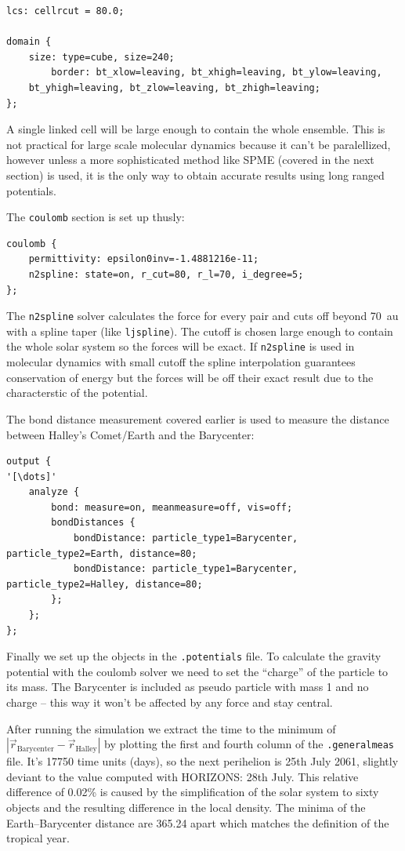 \begin{lstlisting}
lcs: cellrcut = 80.0;

domain {
    size: type=cube, size=240;
        border: bt_xlow=leaving, bt_xhigh=leaving, bt_ylow=leaving,
    bt_yhigh=leaving, bt_zlow=leaving, bt_zhigh=leaving;
};
\end{lstlisting}

A single linked cell will be large enough to contain the whole
ensemble. This is not practical for large scale molecular dynamics
because it can't be paralellized, however unless a more sophisticated
method like SPME (covered in the next section) is used, it is the only
way to obtain accurate results using long ranged potentials.

The \texttt{coulomb} section is set up thusly:

\begin{lstlisting}
coulomb {
    permittivity: epsilon0inv=-1.4881216e-11;
    n2spline: state=on, r_cut=80, r_l=70, i_degree=5;
};
\end{lstlisting}

The \texttt{n2spline} solver calculates the force for every pair and cuts
off beyond \SI{70}{\astronomicalunit} with a spline taper (like
\texttt{ljspline}). The cutoff is chosen large enough to contain the
whole solar system so the forces will be exact. If \texttt{n2spline} is
used in molecular dynamics with small cutoff the spline interpolation
guarantees conservation of energy but the forces will be off their exact
result due to the characterstic of the potential.

The bond distance measurement covered earlier is used to measure the
distance between Halley's Comet/Earth and the Barycenter:
\begin{lstlisting}[escapechar=']
output {
'[\dots]'
    analyze {
        bond: measure=on, meanmeasure=off, vis=off;
        bondDistances {
            bondDistance: particle_type1=Barycenter, particle_type2=Earth, distance=80;
            bondDistance: particle_type1=Barycenter, particle_type2=Halley, distance=80;
        };
    };
};
\end{lstlisting}

Finally we set up the objects in the \texttt{.potentials} file. To
calculate the gravity potential with the coulomb solver we need to set
the ``charge'' of the particle to its mass. The Barycenter is included
as pseudo particle with mass 1 and no charge -- this way it won't be
affected by any force and stay central.

After running the simulation we extract the time to the minimum of
$|\vec r_\mathrm{Barycenter}-\vec r_\mathrm{Halley}|$ by plotting the
first and fourth column of the \texttt{.generalmeas} file. It's 17750
time units (days), so the next perihelion is 25th July 2061, slightly
deviant to the value computed with HORIZONS: 28th July. This relative
difference of 0.02\% is caused by the simplification of the solar system
to sixty objects and the resulting difference in the local density. The
minima of the Earth--Barycenter distance are \SI{365.24}{\siday} apart
which matches the definition of the tropical year.

